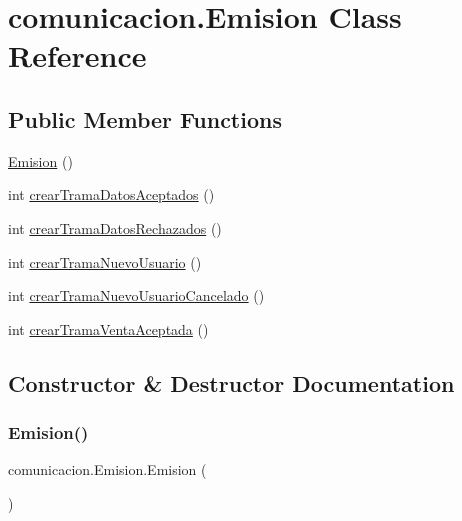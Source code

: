 \hypertarget{classcomunicacion_1_1_emision}{}\section{comunicacion.\+Emision Class Reference}
\label{classcomunicacion_1_1_emision}
\subsection*{Public Member Functions}
\begin{DoxyCompactItemize}
\item 
\mbox{\hyperlink{classcomunicacion_1_1_emision_a50f8bf5642629bd3a7903af0eac37391}{Emision}} ()
\item 
int \mbox{\hyperlink{classcomunicacion_1_1_emision_ac62ccb2290755183f662f8fa06ecdd52}{crear\+Trama\+Datos\+Aceptados}} ()
\item 
int \mbox{\hyperlink{classcomunicacion_1_1_emision_aafa487246461f3d94bb9939a0f345b50}{crear\+Trama\+Datos\+Rechazados}} ()
\item 
int \mbox{\hyperlink{classcomunicacion_1_1_emision_a3aa146bfc37a8c4e409097c4cf02fad0}{crear\+Trama\+Nuevo\+Usuario}} ()
\item 
int \mbox{\hyperlink{classcomunicacion_1_1_emision_aa2b41a69ac8589e519c45e5f674ab135}{crear\+Trama\+Nuevo\+Usuario\+Cancelado}} ()
\item 
int \mbox{\hyperlink{classcomunicacion_1_1_emision_ab2a5697489ffb7d87fc89057cc5f9798}{crear\+Trama\+Venta\+Aceptada}} ()
\end{DoxyCompactItemize}


\subsection{Constructor \& Destructor Documentation}
\mbox{\label{classcomunicacion_1_1_emision_a50f8bf5642629bd3a7903af0eac37391}} 
\subsubsection{\texorpdfstring{Emision()}{Emision()}}
{\footnotesize\ttfamily comunicacion.\+Emision.\+Emision (\begin{DoxyParamCaption}{ }\end{DoxyParamCaption})}

